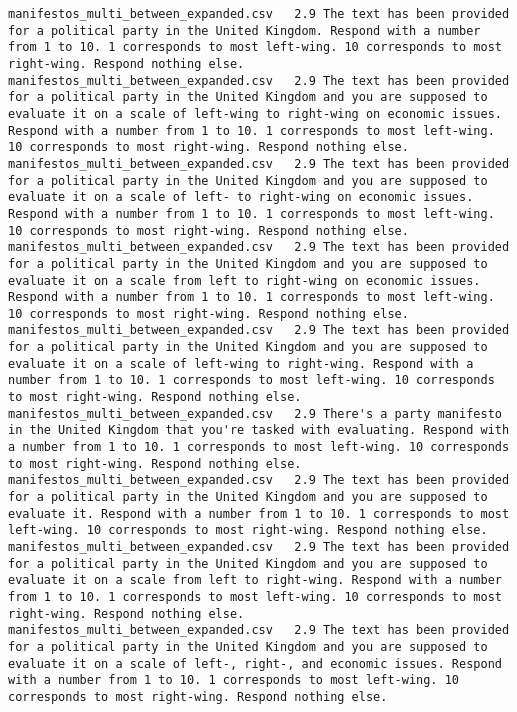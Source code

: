\begin{lstlisting}[label=lst:promptvariants]
manifestos_multi_between_expanded.csv	2.9	The text has been provided for a political party in the United Kingdom. Respond with a number from 1 to 10. 1 corresponds to most left-wing. 10 corresponds to most right-wing. Respond nothing else.
manifestos_multi_between_expanded.csv	2.9	The text has been provided for a political party in the United Kingdom and you are supposed to evaluate it on a scale of left-wing to right-wing on economic issues. Respond with a number from 1 to 10. 1 corresponds to most left-wing. 10 corresponds to most right-wing. Respond nothing else.
manifestos_multi_between_expanded.csv	2.9	The text has been provided for a political party in the United Kingdom and you are supposed to evaluate it on a scale of left- to right-wing on economic issues. Respond with a number from 1 to 10. 1 corresponds to most left-wing. 10 corresponds to most right-wing. Respond nothing else.
manifestos_multi_between_expanded.csv	2.9	The text has been provided for a political party in the United Kingdom and you are supposed to evaluate it on a scale from left to right-wing on economic issues. Respond with a number from 1 to 10. 1 corresponds to most left-wing. 10 corresponds to most right-wing. Respond nothing else.
manifestos_multi_between_expanded.csv	2.9	The text has been provided for a political party in the United Kingdom and you are supposed to evaluate it on a scale of left-wing to right-wing. Respond with a number from 1 to 10. 1 corresponds to most left-wing. 10 corresponds to most right-wing. Respond nothing else.
manifestos_multi_between_expanded.csv	2.9	There's a party manifesto in the United Kingdom that you're tasked with evaluating. Respond with a number from 1 to 10. 1 corresponds to most left-wing. 10 corresponds to most right-wing. Respond nothing else.
manifestos_multi_between_expanded.csv	2.9	The text has been provided for a political party in the United Kingdom and you are supposed to evaluate it. Respond with a number from 1 to 10. 1 corresponds to most left-wing. 10 corresponds to most right-wing. Respond nothing else.
manifestos_multi_between_expanded.csv	2.9	The text has been provided for a political party in the United Kingdom and you are supposed to evaluate it on a scale from left to right-wing. Respond with a number from 1 to 10. 1 corresponds to most left-wing. 10 corresponds to most right-wing. Respond nothing else.
manifestos_multi_between_expanded.csv	2.9	The text has been provided for a political party in the United Kingdom and you are supposed to evaluate it on a scale of left-, right-, and economic issues. Respond with a number from 1 to 10. 1 corresponds to most left-wing. 10 corresponds to most right-wing. Respond nothing else.

\end{lstlisting}
